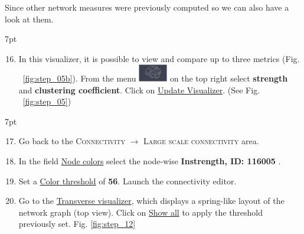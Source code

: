 \documentclass{tufte-handout}
\newenvironment{formal}{%
  \def\FrameCommand{%
    \hspace{1pt}%
    {\color{DarkBlue}\vrule width 2pt}%
    {\color{formalshade}\vrule width 4pt}%
    \colorbox{formalshade}%
  }%
  \MakeFramed{\advance\hsize-\width\FrameRestore}%
  \noindent\hspace{-4.55pt}%
  \begin{adjustwidth}{}{7pt}%
  \vspace{2pt}\vspace{2pt}%
}
{%
  \vspace{2pt}\end{adjustwidth}\endMakeFramed%
}
\begin{document}
\noindent Since other network measures were previously computed so we can also have a look at them. 
\begin{formal}
  \begin{enumerate}[resume] %
  \setcounter{enumi}{15}
  \item In this visualizer, it is possible to view and compare up to three metrics (Fig. ~\ref{fig:step_05b}). From the menu \includegraphics[width=0.1\textwidth]{butt_brain_menu} on the top right select \textbf{strength} and \textbf{clustering coefficient}. Click on \underline{Update Visualizer}. (See Fig. ~\ref{fig:step_05})
  \end{enumerate}
\end{formal}

\begin{formal}
  \begin{enumerate}[resume] %
  \setcounter{enumi}{16}
  \item Go back to the \textsc{Connectivity} $\rightarrow$ \textsc{Large scale connectivity} area. 
  \item  In the field \underline{Node colors} select
the node-wise \textbf{Instrength, ID: 116005} .
\item Set a \underline{Color threshold} of \textbf{56}. Launch the connectivity editor.
  \item Go to the \underline{Transverse visualizer}, which displays a spring-like layout of the network graph (top view). Click on \underline{Show all} to apply the threshold previously set. Fig. \ref{fig:step_12}
  \end{enumerate}
\end{formal}
\end{document}
